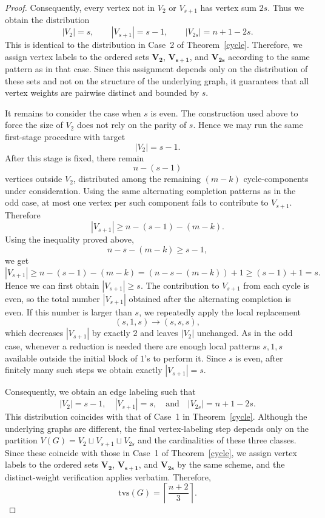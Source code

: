 \documentclass[11pt]{article}
\numberwithin{equation}{section}
\newcommand{\tvs}{\mathrm{tvs}}
\begin{document}
\begin{proof}
Consequently, every vertex not in \(V_2\) or \(V_{s+1}\) has vertex sum \(2s\). Thus we obtain the distribution
\[
|V_2|=s,\qquad |V_{s+1}|=s-1,\qquad |V_{2s}|=n+1-2s.
\]
This is identical to the distribution in Case~2 of Theorem~\ref{cycle}. Therefore, we assign vertex labels to the ordered sets \(\mathbf{V_2}\), \(\mathbf{V_{s+1}}\), and \(\mathbf{V_{2s}}\) according to the same pattern as in that case. Since this assignment depends only on the distribution of these sets and not on the structure of the underlying graph, it guarantees that all vertex weights are pairwise distinct and bounded by $s$.

It remains to consider the case when $s$ is even. The construction used above to force the size of $V_2$ does not rely on the parity of $s$. Hence we may run the same first-stage procedure with target
\[
|V_2|=s-1.
\]
After this stage is fixed, there remain
\[
n-(s-1)
\]
vertices outside $V_2$, distributed among the remaining $(m-k)$ cycle-components under consideration. Using the same alternating completion patterns as in the odd case, at most one vertex per such component fails to contribute to $V_{s+1}$. Therefore
\[
|V_{s+1}|\ge n-(s-1)-(m-k).
\]
Using the inequality proved above,
\[
n-s-(m-k)\ge s-1,
\]
we get
\[
|V_{s+1}|\ge n-(s-1)-(m-k)=(n-s-(m-k))+1\ge (s-1)+1=s.
\]
Hence we can first obtain $|V_{s+1}|\ge s$. The contribution to $V_{s+1}$ from each cycle is even, so the total number $|V_{s+1}|$ obtained after the alternating completion is even. If this number is larger than $s$, we repeatedly apply the local replacement
\[
(s,1,s)\longrightarrow (s,s,s),
\]
which decreases $|V_{s+1}|$ by exactly $2$ and leaves $|V_2|$ unchanged. As in the odd case, whenever a reduction is needed there are enough local patterns $s,1,s$ available outside the initial block of $1$'s to perform it. Since $s$ is even, after finitely many such steps we obtain exactly $|V_{s+1}|=s$.

Consequently, we obtain an edge labeling such that
\[
|V_2|=s-1,\quad |V_{s+1}|=s,\quad \text{and}\quad |V_{2s}|=n+1-2s.
\]
This distribution coincides with that of Case~1 in Theorem~\ref{cycle}. Although the underlying graphs are different, the final vertex-labeling step depends only on the partition \(V(G)=V_2\sqcup V_{s+1}\sqcup V_{2s}\) and the cardinalities of these three classes. Since these coincide with those in Case~1 of Theorem~\ref{cycle}, we assign vertex labels to the ordered sets \(\mathbf{V_2}\), \(\mathbf{V_{s+1}}\), and \(\mathbf{V_{2s}}\) by the same scheme, and the distinct-weight verification applies verbatim. Therefore,
\[
\tvs(G)=\left\lceil\frac{n+2}{3}\right\rceil.
\]

\end{proof}
\end{document}
